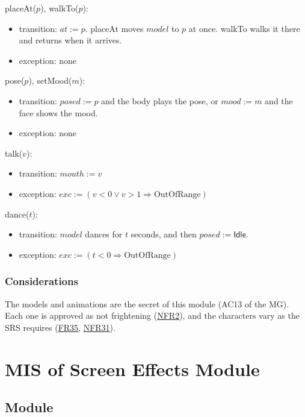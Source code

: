 \documentclass[10pt, titlepage]{article}
\newcommand{\srsurl}{https://team-hindsight.github.io/ophthamology-game/SRS/SRS.pdf}
\newcommand{\srsitemref}[2]{\href{\srsurl\#nameddest=#1}{#2}}
\newcommand{\T}[1]{\mathit{#1}}          %
\newcommand{\V}[1]{\mathsf{#1}}          %
\newcommand{\exc}{\mathit{exc}}
\begin{document}
\noindent placeAt($p$), walkTo($p$):
\begin{itemize}
\item transition: $\T{at} := p$. placeAt moves $\T{model}$ to $p$ at once.
  walkTo walks it there and returns when it arrives.
\item exception: none
\end{itemize}

\noindent pose($p$), setMood($m$):
\begin{itemize}
\item transition: $\T{posed} := p$ and the body plays the pose, or $\T{mood}
  := m$ and the face shows the mood.
\item exception: none
\end{itemize}

\noindent talk($v$):
\begin{itemize}
\item transition: $\T{mouth} := v$
\item exception: $\exc := (v < 0 \vee v > 1 \Rightarrow \text{OutOfRange})$
\end{itemize}

\noindent dance($t$):
\begin{itemize}
\item transition: $\T{model}$ dances for $t$ seconds, and then $\T{posed} :=
  \V{Idle}$.
\item exception: $\exc := (t < 0 \Rightarrow \text{OutOfRange})$
\end{itemize}

\subsubsection{Considerations}

The models and animations are the secret of this module (AC13 of the MG). Each
one is approved as not frightening (\srsitemref{NFR_ChildSafe}{NFR2}), and the
characters vary as the SRS requires (\srsitemref{FR_DiverseCharacters}{FR35},
\srsitemref{NFR_Inclusivity}{NFR31}).

\newpage
\section{MIS of Screen Effects Module} \label{mis:Effects}

\subsection{Module}
\end{document}
